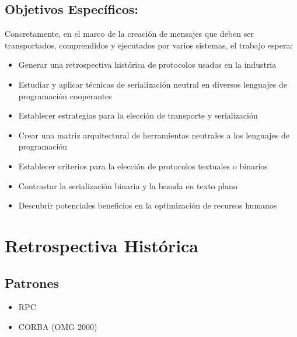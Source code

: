 \subsection{Objetivos Específicos:}
Concretamente, en el marco de la creación de mensajes que deben ser transportados, comprendidos y ejecutados por varios sistemas, el trabajo espera:

\begin{itemize}
  \item Generar una retrospectiva histórica de protocolos usados en la industria
  \item Estudiar y aplicar técnicas de serialización neutral en diversos lenguajes de programación cooperantes
  \item Establecer estrategias para la elección de transporte y serialización
  \item Crear una matriz arquitectural de herramientas neutrales a los lenguajes de programación
  \item Establecer criterios para la elección de protocolos textuales o binarios
  \item Contrastar la serialización binaria y la basada en texto plano
  \item Descubrir potenciales beneficios en la optimización de recursos humanos
\end{itemize}

\section{Retrospectiva Histórica}

\subsection{Patrones}

\begin{itemize}
  \item RPC %
  \item CORBA (OMG 2000) %
\end{itemize}

